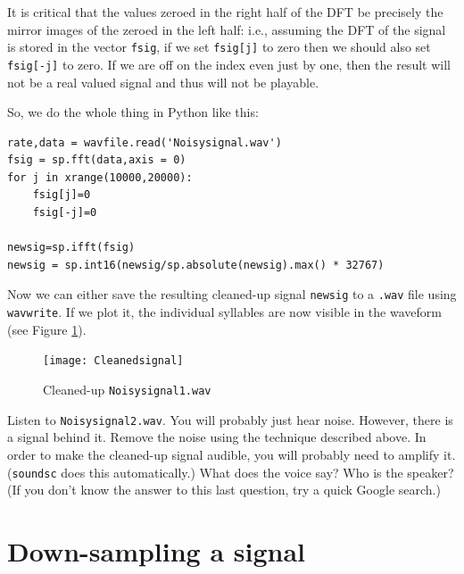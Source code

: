 It is critical that the values zeroed in the right half of the DFT be precisely the mirror images of the zeroed in the left half: i.e., assuming the DFT of the signal is stored in the vector \texttt{fsig}, if we set \texttt{fsig[j]} to zero then we should also set \texttt{fsig[-j]} to zero. If we are off on the index even just by one, then the result will not be a real valued signal and thus will not be playable.

So, we do the whole thing in Python like this:
\begin{lstlisting}
rate,data = wavfile.read('Noisysignal.wav')
fsig = sp.fft(data,axis = 0)
for j in xrange(10000,20000):
    fsig[j]=0
    fsig[-j]=0

newsig=sp.ifft(fsig)
newsig = sp.int16(newsig/sp.absolute(newsig).max() * 32767)
\end{lstlisting}

Now we can either save the resulting cleaned-up signal \texttt{newsig} to a \texttt{.wav} file using \texttt{wavwrite}. If we plot it, the individual syllables are now visible in the waveform (see Figure \ref{cleansignal}).

\begin{figure}[ht]\caption{Cleaned-up \texttt{Noisysignal1.wav} }\label{cleansignal}\centering\texttt{[image: Cleanedsignal]}\end{figure}

\begin{problem}
Listen to \texttt{Noisysignal2.wav}. You will probably just hear noise. However, there is a signal behind it. Remove the noise using the technique described above. In order to make the cleaned-up signal audible, you will probably need to amplify it. (\texttt{soundsc} does this automatically.) What does the voice say? Who is the speaker? (If you don't know the answer to this last question, try a quick Google search.)
\end{problem}

\section*{Down-sampling a signal}

